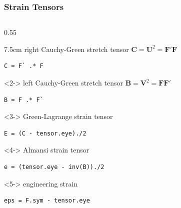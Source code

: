 \documentclass[compress,aspectratio=1610,fleqn]{beamer}
\begin{document}
\begin{frame}[fragile]
%
  \frametitle{Strain Tensors}
          \vspace{-0.5cm}
     \begin{columns}
      \begin{column}{0.55\textwidth}
        \begin{overlayarea}{\textwidth}{7.5cm}
          right Cauchy-Green stretch tensor
          $\mathbf C = \mathbf U^2 = \mathbf F' \mathbf F$ \vspace{-0.2cm}
\begin{lstlisting}[style=input]
C = F` .* F
\end{lstlisting}

          \vspace{0.2cm}

          \begin{onlyenv}<2-> left Cauchy-Green stretch tensor
            $\mathbf B = \mathbf V^2 = \mathbf F \mathbf F'$ \vspace{-0.2cm}
\begin{lstlisting}[style=input]
B = F .* F`
\end{lstlisting}
          \end{onlyenv}

          \vspace{0.2cm}

          \begin{onlyenv}<3-> Green-Lagrange strain tensor \vspace{-0.2cm}
\begin{lstlisting}[style=input]
E = (C - tensor.eye)./2
\end{lstlisting}
          \end{onlyenv}

          \vspace{0.2cm}

          \begin{onlyenv}<4-> Almansi strain tensor \vspace{-0.2cm}
\begin{lstlisting}[style=input]
e = (tensor.eye - inv(B))./2
\end{lstlisting}
          \end{onlyenv}

          \vspace{0.2cm}

          \begin{onlyenv}<5-> engineering strain \vspace{-0.2cm}
\begin{lstlisting}[style=input]
eps = F.sym - tensor.eye
\end{lstlisting}
          \end{onlyenv}


\end{overlayarea}
\end{column}
\end{columns}
\end{frame}
\end{document}
